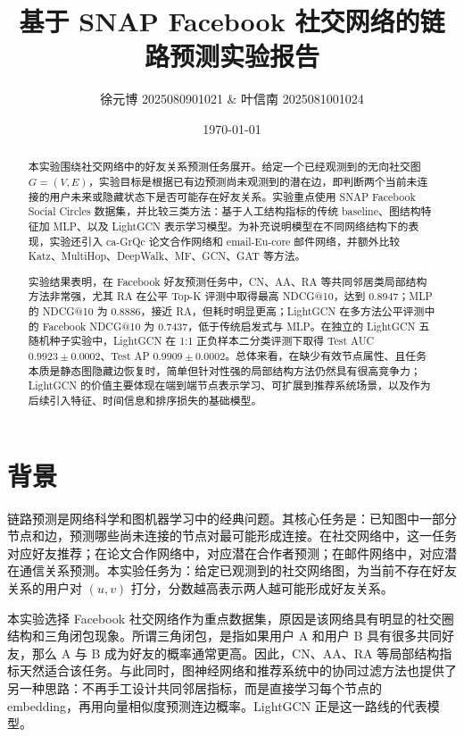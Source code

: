 \documentclass[UTF8,zihao=-4]{ctexart}
\title{\bfseries\color{titleblue}基于 SNAP Facebook 社交网络的链路预测实验报告}
\author{徐元博 2025080901021 \&  叶信南 2025081001024}
\date{\today}
\begin{document}
\maketitle
\tableofcontents
\newpage

\begin{abstract}
本实验围绕社交网络中的好友关系预测任务展开。给定一个已经观测到的无向社交图
\(G=(V,E)\)，实验目标是根据已有边预测尚未观测到的潜在边，即判断两个当前未连接的用户未来或隐藏状态下是否可能存在好友关系。实验重点使用 SNAP Facebook Social Circles 数据集，并比较三类方法：基于人工结构指标的传统 baseline、图结构特征加 MLP、以及 LightGCN 表示学习模型。为补充说明模型在不同网络结构下的表现，实验还引入 ca-GrQc 论文合作网络和 email-Eu-core 邮件网络，并额外比较 Katz、MultiHop、DeepWalk、MF、GCN、GAT 等方法。

实验结果表明，在 Facebook 好友预测任务中，CN、AA、RA 等共同邻居类局部结构方法非常强，尤其 RA 在公平 Top-K 评测中取得最高 NDCG@10，达到 0.8947；MLP 的 NDCG@10 为 0.8886，接近 RA，但耗时明显更高；LightGCN 在多方法公平评测中的 Facebook NDCG@10 为 0.7437，低于传统启发式与 MLP。在独立的 LightGCN 五随机种子实验中，LightGCN 在 1:1 正负样本二分类评测下取得 Test AUC \(0.9923\pm0.0002\)、Test AP \(0.9909\pm0.0002\)。总体来看，在缺少有效节点属性、且任务本质是静态图隐藏边恢复时，简单但针对性强的局部结构方法仍然具有很高竞争力；LightGCN 的价值主要体现在端到端节点表示学习、可扩展到推荐系统场景，以及作为后续引入特征、时间信息和排序损失的基础模型。
\end{abstract}

\section{背景}

链路预测是网络科学和图机器学习中的经典问题。其核心任务是：已知图中一部分节点和边，预测哪些尚未连接的节点对最可能形成连接。在社交网络中，这一任务对应好友推荐；在论文合作网络中，对应潜在合作者预测；在邮件网络中，对应潜在通信关系预测。本实验任务为：给定已观测到的社交网络图，为当前不存在好友关系的用户对 \((u,v)\) 打分，分数越高表示两人越可能形成好友关系。

本实验选择 Facebook 社交网络作为重点数据集，原因是该网络具有明显的社交圈结构和三角闭包现象。所谓三角闭包，是指如果用户 A 和用户 B 具有很多共同好友，那么 A 与 B 成为好友的概率通常更高。因此，CN、AA、RA 等局部结构指标天然适合该任务。与此同时，图神经网络和推荐系统中的协同过滤方法也提供了另一种思路：不再手工设计共同邻居指标，而是直接学习每个节点的 embedding，再用向量相似度预测连边概率。LightGCN 正是这一路线的代表模型。
\end{document}
